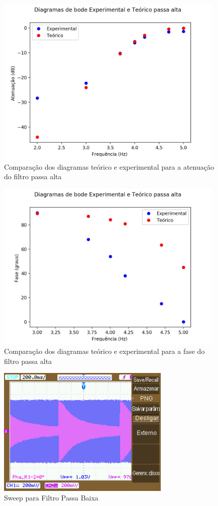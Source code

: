 \documentclass{article}
\begin{document}
\begin{figure}[h!]
\centering
\includegraphics[height=8.2cm]{images/passa_alta_ate_ambos.jpg}
\caption{Comparação dos diagramas teórico e experimental para a atenuação do filtro passa alta}
\label{fig:passa_alta_atenucao_ambos}
\end{figure}

\begin{figure}[h!]
\centering
\includegraphics[height=8.2cm]{images/passa_alta_fase_ambos.jpg}
\caption{Comparação dos diagramas teórico e experimental para a fase do filtro passa alta}
\label{fig:passa_alta_fase_ambos}
\end{figure}


\begin{figure}[h!]
\centering
\includegraphics[height=6.2cm]{images/NewFile28.png}
\caption{Sweep para Filtro Passa Baixa}
\label{fig:sweep_baixa}
\end{figure}
\end{document}
